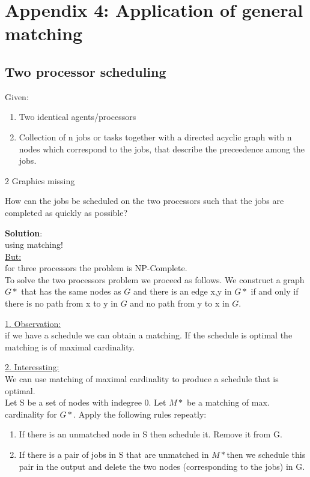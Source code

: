\chapter*{ Appendix 4: Application of general matching}

\section{Two processor scheduling}

Given:\\
\begin{enumerate}
  \item Two identical agents/processors
  \item Collection of n jobs or tasks together with a directed acyclic graph with n nodes which correspond to the jobs, that describe the preceedence among the jobs.
\end{enumerate}


\begin{example}
2 Graphics missing

\end{example}

How can the jobs be scheduled on the two processors such that the jobs are completed as quickly as possible?

\textbf{Solution}:\\
using matching!\\
\underline{But:}\\
for three processors the problem is NP-Complete.\\

To solve the two processors problem we proceed as follows. We construct a graph $G*$ that has the same nodes as $G$ and there is an edge {x,y} in $G*$ if and only if there is no path from x to y in $G$ and no path from y to x in $G$.

\underline{1. Observation:}\\
if we have a schedule we can obtain a matching. If the schedule is optimal the matching is of maximal cardinality.

\underline{2. Interessting:}\\
We can use matching of maximal cardinality to produce a schedule that is optimal.\\

Let S be a set of nodes with indegree 0. Let $M*$ be a matching of max. cardinality for $G*$. Apply the following rules repeatly:\\
\begin{enumerate}
  \item If there is an unmatched node in S then schedule it. Remove it from G.
  \item If there is a pair of jobs in S that are unmatched in $M*$then we schedule this pair in the output and delete the two nodes (corresponding to the jobs) in G.
\end{enumerate}

